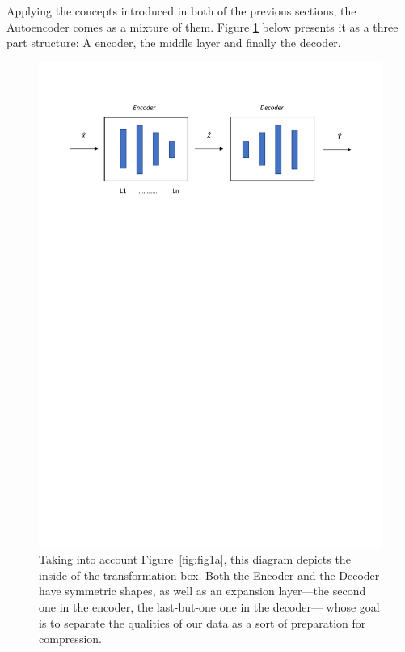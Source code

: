 Applying the concepts introduced in both of the previous sections, the Autoencoder comes as a mixture of them. Figure \ref{fig:figure_autoencoder} below presents it as a three part structure: A encoder, the middle layer and finally the decoder. %
%
\begin{figure}[H]
 \centering
  \includegraphics[width=16cm]{Figuras_tfg/Figura_autoencoder}
  \caption{Taking into account Figure~\ref{fig:fig1a}, this diagram depicts the inside of the transformation box. Both the Encoder and the Decoder have symmetric shapes, as well as an expansion layer---the second one in the encoder, the last-but-one one in the decoder--- whose goal is to separate the qualities of our data as a sort of preparation for compression.}
 \label{fig:figure_autoencoder}
\end{figure} 


